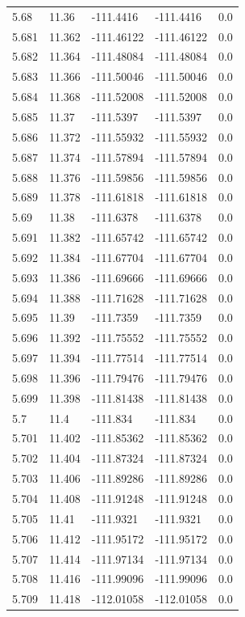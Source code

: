 \begin{tabular}{lllll}
5.68 & 11.36 & -111.4416 & -111.4416 & 0.0 \\
5.681 & 11.362 & -111.46122 & -111.46122 & 0.0 \\
5.682 & 11.364 & -111.48084 & -111.48084 & 0.0 \\
5.683 & 11.366 & -111.50046 & -111.50046 & 0.0 \\
5.684 & 11.368 & -111.52008 & -111.52008 & 0.0 \\
5.685 & 11.37 & -111.5397 & -111.5397 & 0.0 \\
5.686 & 11.372 & -111.55932 & -111.55932 & 0.0 \\
5.687 & 11.374 & -111.57894 & -111.57894 & 0.0 \\
5.688 & 11.376 & -111.59856 & -111.59856 & 0.0 \\
5.689 & 11.378 & -111.61818 & -111.61818 & 0.0 \\
5.69 & 11.38 & -111.6378 & -111.6378 & 0.0 \\
5.691 & 11.382 & -111.65742 & -111.65742 & 0.0 \\
5.692 & 11.384 & -111.67704 & -111.67704 & 0.0 \\
5.693 & 11.386 & -111.69666 & -111.69666 & 0.0 \\
5.694 & 11.388 & -111.71628 & -111.71628 & 0.0 \\
5.695 & 11.39 & -111.7359 & -111.7359 & 0.0 \\
5.696 & 11.392 & -111.75552 & -111.75552 & 0.0 \\
5.697 & 11.394 & -111.77514 & -111.77514 & 0.0 \\
5.698 & 11.396 & -111.79476 & -111.79476 & 0.0 \\
5.699 & 11.398 & -111.81438 & -111.81438 & 0.0 \\
5.7 & 11.4 & -111.834 & -111.834 & 0.0 \\
5.701 & 11.402 & -111.85362 & -111.85362 & 0.0 \\
5.702 & 11.404 & -111.87324 & -111.87324 & 0.0 \\
5.703 & 11.406 & -111.89286 & -111.89286 & 0.0 \\
5.704 & 11.408 & -111.91248 & -111.91248 & 0.0 \\
5.705 & 11.41 & -111.9321 & -111.9321 & 0.0 \\
5.706 & 11.412 & -111.95172 & -111.95172 & 0.0 \\
5.707 & 11.414 & -111.97134 & -111.97134 & 0.0 \\
5.708 & 11.416 & -111.99096 & -111.99096 & 0.0 \\
5.709 & 11.418 & -112.01058 & -112.01058 & 0.0 \\

\end{tabular}
